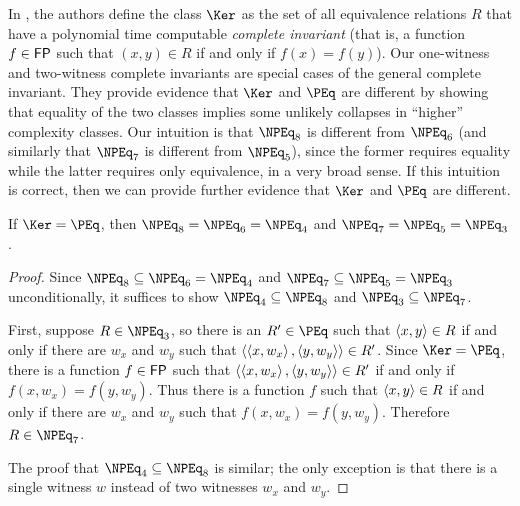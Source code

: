 In \autocite{fg11}, the authors define the class $\Ker$ as the set of all equivalence relations $R$ that have a polynomial time computable \emph{complete invariant} (that is, a function $f \in {\ensuremath{\mathsf{FP}}}$ such that $(x, y) \in R$ if and only if $f(x) = f(y)$).
Our one-witness and two-witness complete invariants are special cases of the general complete invariant.
They provide evidence that $\Ker$ and $\PEq$ are different by showing that equality of the two classes implies some unlikely collapses in ``higher'' complexity classes.
Our intuition is that $\NPEq_8$ is different from $\NPEq_6$ (and similarly that $\NPEq_7$ is different from $\NPEq_5$), since the former requires equality while the latter requires only equivalence, in a very broad sense.
If this intuition is correct, then we can provide further evidence that $\Ker$ and $\PEq$ are different.

\begin{theorem}
  If $\Ker = \PEq$, then $\NPEq_8 = \NPEq_6 = \NPEq_4$ and $\NPEq_7 = \NPEq_5 = \NPEq_3$.
\end{theorem}
\begin{proof}
  Since $\NPEq_8 \subseteq \NPEq_6 = \NPEq_4$ and $\NPEq_7 \subseteq \NPEq_5 = \NPEq_3$ unconditionally, it suffices to show $\NPEq_4 \subseteq \NPEq_8$ and $\NPEq_3 \subseteq \NPEq_7$.

  First, suppose $R \in \NPEq_3$, so there is an $R' \in \PEq$ such that $\left\langle x,y\right\rangle \in R$ if and only if there are $w_x$ and $w_y$ such that $\left\langle\left\langle x,w_x\right\rangle,\left\langle y,w_y\right\rangle\right\rangle \in R'$.
  Since $\Ker = \PEq$, there is a function $f \in {\ensuremath{\mathsf{FP}}}$ such that $\left\langle\left\langle x,w_x\right\rangle,\left\langle y,w_y\right\rangle\right\rangle \in R'$ if and only if $f(x, w_x) = f(y, w_y)$.
  Thus there is a function $f$ such that $\left\langle x,y\right\rangle \in R$ if and only if there are $w_x$ and $w_y$ such that $f(x, w_x) = f(y, w_y)$.
  Therefore $R \in \NPEq_7$.

  The proof that $\NPEq_4 \subseteq \NPEq_8$ is similar; the only exception is that there is a single witness $w$ instead of two witnesses $w_x$ and $w_y$.
\end{proof}

